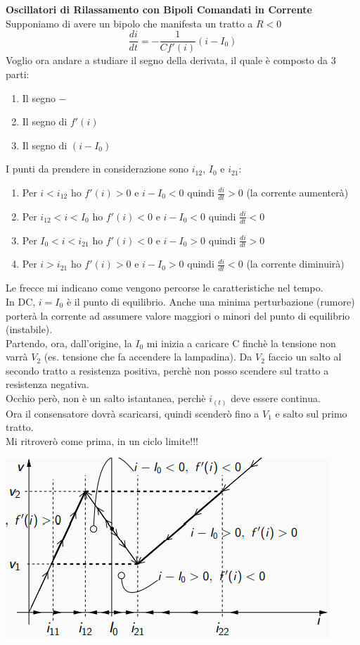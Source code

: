 \documentclass{article}
\begin{document}
\\\\
\textbf{Oscillatori di Rilassamento con Bipoli Comandati in Corrente}\\
Supponiamo di avere un bipolo che manifesta un tratto a $R<0$
\begin{equation}
    \frac{di}{dt}=-\frac{1}{Cf'(i)}(i-I_{0})
\end{equation}
Voglio ora andare a studiare il segno della derivata, il quale è composto da 3 parti:
\begin{enumerate}
    \item Il segno $-$
    \item Il segno di $f'(i)$
    \item Il segno di $(i-I_{0})$
\end{enumerate}
\newpage
I punti da prendere in considerazione sono $i_{12}$, $I_{0}$ e $i_{21}$:
\begin{enumerate}
    \item Per \textbf{$i<i_{12}$} ho $f'(i)>0$ e $i-I_{0}<0$ quindi $\frac{di}{dt}>0$ (la corrente aumenterà)
    \item Per \textbf{$i_{12}<i<I_{0}$} ho $f'(i)<0$ e $i-I_{0}<0$ quindi $\frac{di}{dt}<0$
      \item Per \textbf{$I_{0}<i<i_{21}$} ho $f'(i)<0$ e $i-I_{0}>0$ quindi $\frac{di}{dt}>0$
      \item Per \textbf{$i>i_{21}$} ho $f'(i)>0$ e $i-I_{0}>0$ quindi $\frac{di}{dt}<0$ (la corrente diminuirà)
\end{enumerate} 
Le frecce mi indicano come vengono percorse le caratteristiche nel tempo.\\
In DC, $i=I_{0}$ è il punto di equilibrio. Anche una minima perturbazione (rumore) porterà la corrente ad assumere valore maggiori o minori del punto di equilibrio (instabile).\\
Partendo, ora, dall'origine, la $I_{0}$ mi inizia a caricare C finchè la tensione non varrà $V_{2}$ (es. tensione che fa accendere la lampadina). Da $V_{2}$ faccio un salto al secondo tratto a resistenza positiva, perchè non posso scendere sul tratto a resistenza negativa.\\
Occhio però, non è un salto istantanea, perchè $i_(t)$ deve essere continua.\\
Ora il consensatore dovrà scaricarsi, quindi scenderò fino a $V_{1}$ e salto sul primo tratto.\\
Mi ritroverò come prima, in un ciclo limite!!!
\begin{center}
    \includegraphics[]{Derivata.png}
\end{center}
\end{document}
